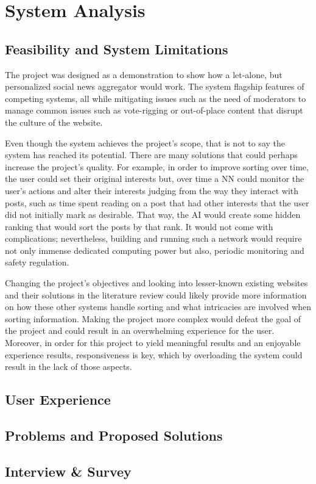 
\chapter{System Analysis}

\section{Feasibility and System Limitations}
The project was designed as a demonstration to show how a let-alone, but personalized social news aggregator would work. The system flagship features of competing systems, all while mitigating issues such as the need of moderators to manage common issues such as vote-rigging or out-of-place content that disrupt the culture of the website.

Even though the system achieves the project's scope, that is not to say the system has reached its potential. There are many solutions that could perhaps increase the project's quality. For example, in order to improve sorting over time, the user could set their original interests but, over time a NN could monitor the user's actions and alter their interests judging from the way they interact with posts, such as time spent reading on a post that had other interests that the user did not initially mark as desirable. That way, the AI would create some hidden ranking that would sort the posts by that rank. It would not come with complications; nevertheless, building and running such a network would require not only immense dedicated computing power but also, periodic monitoring and safety regulation.

Changing the project's objectives and looking into lesser-known existing websites and their solutions in the literature review could likely provide more information on how these other systems handle sorting and what intricacies are involved when sorting information. Making the project more complex would defeat the goal of the project and could result in an overwhelming experience for the user. Moreover, in order for this project to yield meaningful results and an enjoyable experience results, responsiveness is key, which by overloading the system could result in the lack of those aspects.

\section{User Experience}


\section{Problems and Proposed Solutions}

\section{Interview \& Survey}
